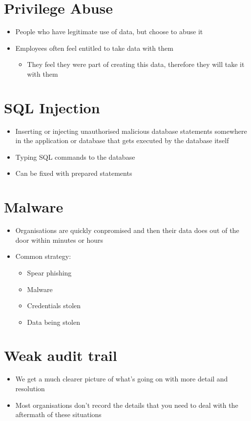 \documentclass{article}[18pt]
\begin{document}
\section{Privilege Abuse}
\begin{itemize}
	\item People who have legitimate use of data, but choose to abuse it
	\item Employees often feel entitled to take data with them
	\begin{itemize}
		\item They feel they were part of creating this data, therefore they will take it with them
	\end{itemize}
\end{itemize}
\section{SQL Injection}
\begin{itemize}
	\item Inserting or injecting unauthorised malicious database statements somewhere in the application or database that gets executed by the database itself
	\item Typing SQL commands to the database
	\item Can be fixed with prepared statements
\end{itemize}
\section{Malware}
\begin{itemize}
	\item Organisations are quickly conpromised and then their data does out of the door within minutes or hours
	\item Common strategy:
	\begin{itemize}
		\item Spear phishing
		\item Malware
		\item Credentials stolen
		\item Data being stolen
	\end{itemize}
\end{itemize}
\section{Weak audit trail}
\begin{itemize}
	\item We get a much clearer picture of what's going on with more detail and resolution
	\item Most organisations don't record the details that you need to deal with the aftermath of these situations
\end{itemize}
\end{document}
